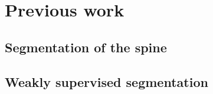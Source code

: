 \chapter{Previous work}

\section{Segmentation of the spine}

\section{Weakly supervised segmentation}